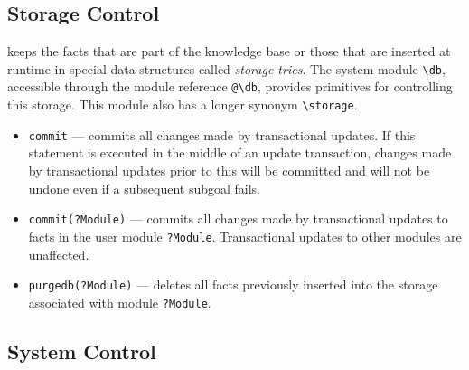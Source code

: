 \documentclass[11pt]{article}
\newcommand{\ERGO}{\mbox{\smaller{\ensuremath{\cal{E}}\smaller{{\sc{RGO}}}}}\xspace}
\newcommand{\FLSYSTEM}{\ERGO}
\newcommand{\bs}{\textbackslash}
\begin{document}
\subsection{Storage Control}\label{sec:storage-ctl}

\FLSYSTEM keeps the facts that are part of the knowledge base or those that are
inserted at runtime in special data structures called \emph{storage
  tries}.  The system module {\tt \bs{}db}, accessible through the module
reference {\tt @\bs{}db}, provides primitives for controlling this
storage. This module also has a longer synonym {\tt \bs{}storage}. 
\begin{itemize}
  \item  {\tt commit} --- commits all changes made by transactional updates.
    If this statement is executed in the middle of an update transaction,
    changes made by transactional updates prior to this will be committed
    and will not be undone even if a subsequent subgoal fails.
  \item {\tt commit(?Module)} --- commits all changes made by transactional
    updates to facts in the user module {\tt ?Module}. Transactional updates
    to other modules are unaffected.
  \item {\tt purgedb(?Module)} --- deletes all facts previously inserted
    into the storage associated with module {\tt ?Module}.
\end{itemize}

\subsection{System Control}\label{sec-flora-syscontrol}
\end{document}
